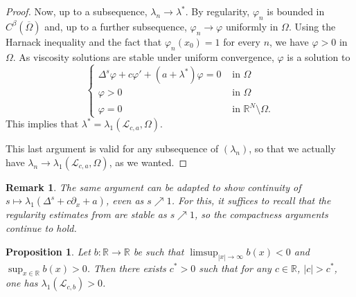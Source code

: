\documentclass[11pt,a4paper]{amsart}
\newcommand{\Lop}{\mathcal{L}}
\newcommand{\R}{\mathbb{R}}
\newcommand{\inSet}[1]{\text{ in } {#1}}
\renewcommand{\phi}{\varphi}
\newtheorem{prop}[thm]{Proposition}
\newtheorem{rmk}{Remark}
\begin{document}
\begin{proof}
Now, up to a subsequence, $\lambda_n \rightarrow \lambda^*$. By regularity, $\phi_n$ is bounded in $C^{\beta}(\overline{\Omega})$ and, up to a further subsequence, $\phi_n \rightarrow \phi$ uniformly in $\Omega$. Using the Harnack inequality and the fact that $\phi_n(x_0) = 1$ for every $n$, we have $\phi >0$ in $\Omega$. As viscosity solutions are stable under uniform convergence, $\phi$ is a solution to 
\[\begin{cases}
\Delta^s \phi + c\phi' + (a + \lambda^*)\phi = 0 & \inSet{\Omega}\\
\phi > 0 & \inSet{\Omega}\\
\phi= 0 & \inSet{\R^N\setminus\Omega}.
\end{cases}\] 
This implies that $\lambda^* = \lambda_1(\Lop_{c,a},\Omega)$.

This last argument is valid for any subsequence of $(\lambda_n)$, so that we actually have $\lambda_n \rightarrow \lambda_1(\Lop_{c,a},\Omega)$, as we wanted. 
\end{proof}

\begin{rmk}
The same argument can be adapted to show continuity of $s \mapsto \lambda_1(\Delta^s + c\partial_x + a)$, even as $s\nearrow 1$. For this, it suffices to recall that the regularity estimates from \cite{CL12} are stable as $s\nearrow 1$, so the compactness arguments continue to hold.
\end{rmk}

\begin{prop}
\label{prop:upper_threshold}
Let $b:\R\rightarrow \R$ be such that $\limsup_{|x|\rightarrow \infty} b(x) < 0$ and $\sup_{x\in \R} b(x) > 0$. Then there exists $c^* >0$ such that for any $c \in \R$, $|c| > c^*$, one has $\lambda_1(\Lop_{c,b}) > 0$. 
\end{prop}
\end{document}
